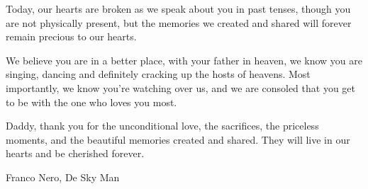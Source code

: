 %

\vspace*{\fill}

\begin{lifeenvoi}
  Today, our hearts are broken as we speak about you in past tenses, though
  you are not physically present, but the memories we created and shared will
  forever remain precious to our hearts.

  We believe you are in a better place, with your father in heaven, we know
  you are singing, dancing and definitely cracking up the hosts of heavens.
  Most importantly, we know you're watching over us, and we are consoled that
  you get to be with the one who loves you most.

  Daddy, thank you for the unconditional love, the sacrifices, the priceless
  moments, and the beautiful memories created and shared. They will live in
  our hearts and be cherished forever.
\end{lifeenvoi}

%
{Franco Nero, De Sky Man}

\vspace*{\fill}
